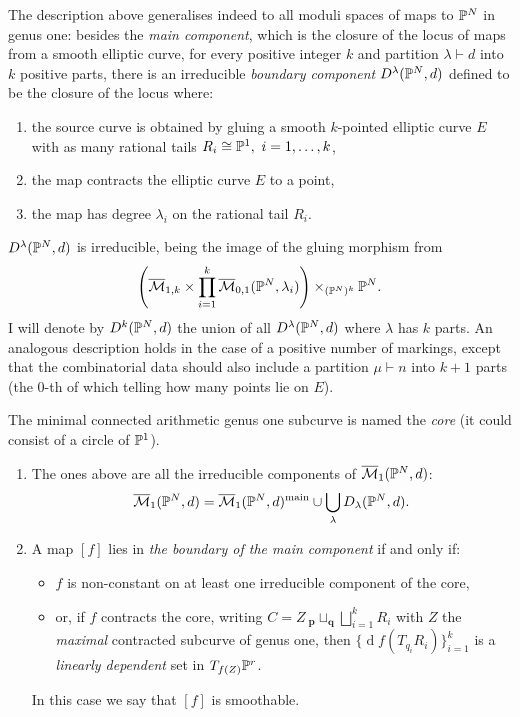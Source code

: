 The description above generalises indeed to all moduli spaces of maps to $\mathbb P^N$ in genus one:
besides the \emph{main component}, which is the closure of the locus of maps from a smooth elliptic curve, for every positive integer $k$ and partition $\lambda\vdash d$ into $k$ positive parts, there is an irreducible \emph{boundary component} $D^{\lambda}(\mathbb P^N,d)$ defined to be the closure of the locus where:
\begin{enumerate}[label=(\roman*)]
\item the source curve is obtained by gluing a smooth $k$-pointed elliptic curve $E$ with as many rational tails $R_i\cong\PP^1,\ i=1,\ldots,k$,
\item the map contracts the elliptic curve $E$ to a point, 
\item the map has degree $\lambda_i$ on the rational tail $R_i$.
\end{enumerate}
$D^{\lambda}(\mathbb P^N,d)$ is irreducible, being the image of the gluing morphism from
\[\left(\overline{\mathcal{M}}_{1,k}\times\prod_{i=1}^k\overline{\mathcal{M}}_{0,1}(\mathbb P^N,\lambda_i)\right)\times_{(\mathbb P^N)^k}\mathbb P^N.\]
I will denote by $D^k(\mathbb P^N,d)$ the union of all $D^{\lambda}(\mathbb P^N,d)$ where $\lambda$ has $k$ parts. An analogous description holds in the case of a positive number of markings, except that the combinatorial data should also include a partition $\mu\vdash n$ into $k+1$ parts (the $0$-th of which telling how many points lie on $E$).

\begin{prop}\label{prop:components} The minimal connected arithmetic genus one subcurve is named the \emph{core} (it could consist of a circle of $\mathbb P^1$).
\begin{enumerate}
 \item The ones above are all the irreducible components of $\overline{\mathcal{M}}_1(\mathbb P^N,d)$: 
\[\overline{\mathcal{M}}_1(\mathbb P^N,d)=\overline{\mathcal{M}}_1(\mathbb P^N,d)^{\rm{main}}\cup\bigcup_{\lambda}D_{\lambda}(\mathbb P^N,d).\]
\item A map $[f]$ lies in \emph{the boundary of the main component}  if and only if:
\begin{itemize}[leftmargin=0cm]
\item $f$ is non-constant on at least one irreducible component of the core,
\item or, if $f$ contracts the core, writing $C=Z\ {}_{\mathbf p}\!\sqcup_{\mathbf q}\bigsqcup_{i=1}^k R_i$ with $Z$ the \emph{maximal} contracted subcurve of genus one, then $\{\operatorname{d}\!f(T_{q_i}R_i)\}_{i=1}^k$ is a \emph{linearly dependent} set in $T_{f(Z)}\mathbb P^r$.
\end{itemize}
In this case we say that $[f]$ is smoothable.
\end{enumerate}
\end{prop}
 
